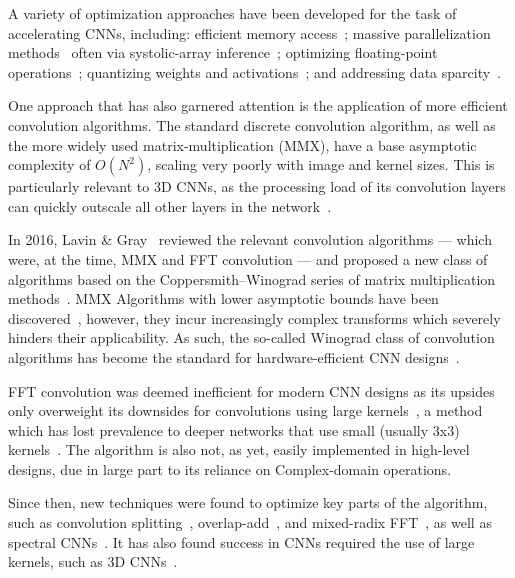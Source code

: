 \documentclass[
  10pt,
  \FORMAT-MODE,
  \REVIEW-MODE,
  \TWOSIDE-MODE
]{IEEEtran}
\begin{document}
  A variety of optimization approaches have been developed for the task of accelerating CNNs, including: efficient memory access~\cite{han2016cnn,jiang2021optimized,doumet2024h2pipe}; massive parallelization methods~\cite{jouppi2020domain,choquette2021nvidia} often via systolic-array inference~\cite{chua2022systolic}; optimizing floating-point operations~\cite{fan2021high}; quantizing weights and activations~\cite{he2023research,salah2025post}; and addressing data sparcity~\cite{jiang2021optimized,fan2021high}.

  One approach that has also garnered attention is the application of more efficient convolution algorithms. The standard discrete convolution algorithm, as well as the more widely used matrix-multiplication (MMX), have a base asymptotic complexity of $O(N^2)$, scaling very poorly with image and kernel sizes. This is particularly relevant to 3D CNNs, as the processing load of its convolution layers can quickly outscale all other layers in the network~\cite{hegde2018morph}.

  In 2016, Lavin \& Gray~\cite{lavin2016fast} reviewed the relevant convolution algorithms --- which were, at the time, MMX and FFT convolution --- and proposed a new class of algorithms based on the Coppersmith–Winograd series of matrix multiplication methods~\cite{coppersmith1982asymptotic}. MMX Algorithms with lower asymptotic bounds have been discovered~\cite{karstadt2020matrix,schwartz2023pebbling}, however, they incur increasingly complex transforms which severely hinders their applicability. As such, the so-called Winograd class of convolution algorithms has become the standard for hardware-efficient CNN designs~\cite{shen2018towards,barabasz2019winograd,vardhana2025high}.

  FFT convolution was deemed inefficient for modern CNN designs as its upsides only overweight its downsides for convolutions using large kernels~\cite{lavin2016fast}, a method which has lost prevalence to deeper networks that use small (usually 3x3) kernels~\cite{simonyan2014very}. The algorithm is also not, as yet, easily implemented in high-level designs, due in large part to its reliance on Complex-domain operations.
  
  Since then, new techniques were found to optimize key parts of the algorithm, such as convolution splitting~\cite{chitsaz2020acceleration}, overlap-add~\cite{highlander2016very,chen2024fast}, and mixed-radix FFT~\cite{meng2024high}, as well as spectral CNNs~\cite{pratt2017fcnn,liu2021accelerating,ayat2019spectral,han2021deep,watanabe2021image}. It has also found success in CNNs required the use of large kernels, such as 3D CNNs~\cite{nguyen2016energy, lan2017high, li20243d}.
\end{document}
